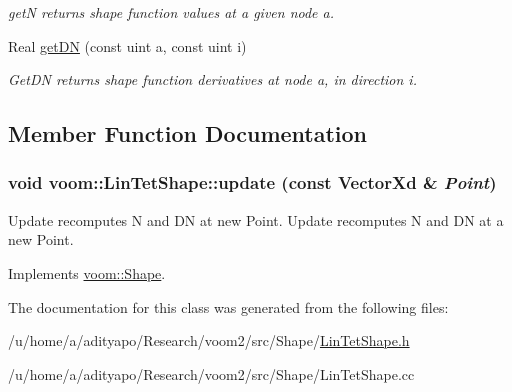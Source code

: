 \begin{DoxyCompactItemize}
\begin{DoxyCompactList}\small\item\em getN returns shape function values at a given node a. \item\end{DoxyCompactList}\item 
\hypertarget{classvoom_1_1_lin_tet_shape_a73f4e058efacab88451e81ef1832aa48}{
Real \hyperlink{classvoom_1_1_lin_tet_shape_a73f4e058efacab88451e81ef1832aa48}{getDN} (const uint a, const uint i)}
\label{classvoom_1_1_lin_tet_shape_a73f4e058efacab88451e81ef1832aa48}

\begin{DoxyCompactList}\small\item\em GetDN returns shape function derivatives at node a, in direction i. \item\end{DoxyCompactList}\end{DoxyCompactItemize}


\subsection{Member Function Documentation}
\hypertarget{classvoom_1_1_lin_tet_shape_a9a1ac89c0cfd33e4d1eb459b2d9c595e}{
\subsubsection[{update}]{\setlength{\rightskip}{0pt plus 5cm}void voom::LinTetShape::update (const VectorXd \& {\em Point})}}
\label{classvoom_1_1_lin_tet_shape_a9a1ac89c0cfd33e4d1eb459b2d9c595e}


Update recomputes N and DN at new Point. Update recomputes N and DN at a new Point. 

Implements \hyperlink{classvoom_1_1_shape_a8ded544de12647543b056cec61be9f26}{voom::Shape}.

The documentation for this class was generated from the following files:\begin{DoxyCompactItemize}
\item 
/u/home/a/adityapo/Research/voom2/src/Shape/\hyperlink{_lin_tet_shape_8h}{LinTetShape.h}\item 
/u/home/a/adityapo/Research/voom2/src/Shape/LinTetShape.cc\end{DoxyCompactItemize}
